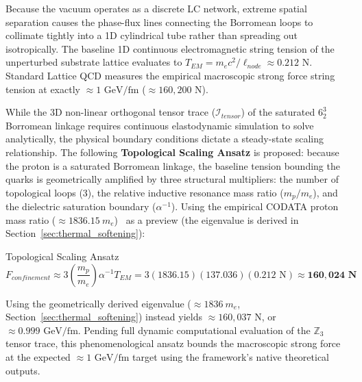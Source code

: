 Because the vacuum operates as a discrete LC network, extreme spatial separation causes the phase-flux lines connecting the Borromean loops to collimate tightly into a 1D cylindrical tube rather than spreading out isotropically. The baseline 1D continuous electromagnetic string tension of the unperturbed substrate lattice evaluates to $T_{EM}=m_{e}c^{2}/\ell_{node}\approx0.212\text{ N}$. Standard Lattice QCD measures the empirical macroscopic strong force string tension at exactly $\approx 1\text{ GeV/fm}$ ($\approx 160,200\text{ N}$). 

While the 3D non-linear orthogonal tensor trace ($\mathcal{I}_{tensor}$) of the saturated $6_2^3$ Borromean linkage requires continuous elastodynamic simulation to solve analytically, the physical boundary conditions dictate a steady-state scaling relationship. The following \textbf{Topological Scaling Ansatz} is proposed: because the proton is a saturated Borromean linkage, the baseline tension bounding the quarks is geometrically amplified by three structural multipliers: the number of topological loops (3), the relative inductive resonance mass ratio ($m_p/m_e$), and the dielectric saturation boundary ($\alpha^{-1}$). Using the empirical CODATA proton mass ratio ($\approx 1836.15 \ m_e$)~\cite{codata2018} as a preview (the eigenvalue is derived in Section~\ref{sec:thermal_softening}):

\begin{resultbox}{Topological Scaling Ansatz}
\begin{equation}
    F_{confinement} \approx 3\left(\frac{m_p}{m_e}\right)\alpha^{-1}T_{EM} = 3(1836.15)(137.036)(0.212\text{ N}) \approx \mathbf{160,024\text{ N}}
\end{equation}
\end{resultbox}
    
Using the geometrically derived eigenvalue ($\approx 1836\ m_e$, Section~\ref{sec:thermal_softening}) instead yields $\approx 160{,}037\text{ N}$, or $\approx 0.999\text{ GeV/fm}$. Pending full dynamic computational evaluation of the $\mathbb{Z}_3$ tensor trace, this phenomenological ansatz bounds the macroscopic strong force at the expected $\approx 1\text{ GeV/fm}$ target using the framework's native theoretical outputs.

